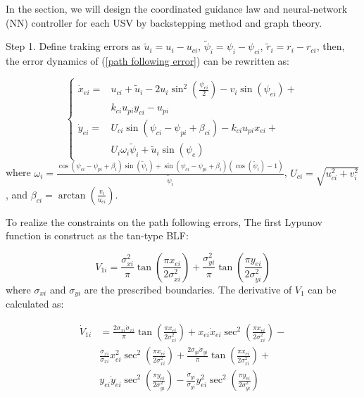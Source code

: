 \documentclass[english]{cccconf}
\begin{document}
In the section, we will design the coordinated guidance law and neural-network (NN) controller for each USV by backstepping method and graph theory.

Step 1. Define traking errors as $\tilde{u}_i=u_i-u_{ci}$, $\tilde{\psi}_i=\psi_i-\psi_{ci}$, $\tilde{r}_i=r_i-r_{ci}$, then, the error dynamics of (\ref{path following error}) can be rewritten as:

\begin{equation}\label{path following error dynamics 1}
	\left\{
	\begin{aligned}
		\dot{x}_{ei}=&u_{ci}+\tilde{u}_i-2u_i\sin^2(\frac{\psi_{ei}}{2})-v_i\sin(\psi_{ei})+\\&k_{ci}u_{pi}y_{ei}-u_{pi}\\
		\dot{y}_{ei}=&U_{ci}\sin(\psi_{ci}-\psi_{pi}+\beta_{ci})-k_{ci}u_{pi}x_{ei}+\\&U_i\omega_i\tilde{\psi}_i+\tilde{u}_i\sin(\psi_{e})
	\end{aligned}
	\right.
\end{equation}
where $\omega_i=\frac{\cos(\psi_{ci}-\psi_{pi}+\beta_i)\sin(\tilde{\psi}_i)+\sin(\psi_{ci}-\psi_{pi}+\beta_i)(\cos(\tilde{\psi}_i)-1)}{\tilde{\psi}_i}$, $U_{ci}=\sqrt{u^2_{ci}+v^2_{i}}$, and $\beta_{ci}=\arctan({\frac{v_i}{u_{ci}}})$.

To realize the constraints on the path following errors, The first Lypunov function is construct as the tan-type BLF:

\begin{equation}\label{V1}
	V_{1i}=\frac{\sigma^2_{xi}}{\pi}\tan(\frac{\pi x_{ei}}{2\sigma^2_{xi}})+\frac{\sigma^2_{yi}}{\pi}\tan(\frac{\pi y_{ei}}{2\sigma^2_{yi}})
\end{equation}
where $\sigma_{xi}$ and $\sigma_{yi}$ are the prescribed boundaries. The derivative of $V_1$ can be calculated as:

\begin{equation}\label{V1dot0}
	\begin{aligned}
		\dot{V}_{1i}&=\frac{2\sigma_{xi}\dot{\sigma}_{xi}}{\pi}\tan(\frac{\pi x_{ei}}{2\sigma^2_{xi}})+x_{ei}\dot{x}_{ei}\sec^2(\frac{\pi x_{ei}}{2\sigma^2_{xi}})-\\
		&\frac{\dot{\sigma}_{xi}}{\sigma_{xi}}x^2_{ei}\sec^2(\frac{\pi x_{ei}}{2\sigma^2_{xi}})+\frac{2\sigma_{yi}\dot{\sigma}_{yi}}{\pi}\tan(\frac{\pi x_{ei}}{2\sigma^2_{xi}})+\\
		&y_{ei}\dot{y}_{ei}\sec^2(\frac{\pi y_{ei}}{2\sigma^2_{yi}})-\frac{\dot{\sigma}_{yi}}{\sigma_{yi}}y^2_{ei}\sec^2(\frac{\pi y_{ei}}{2\sigma^2_{yi}})
	\end{aligned}
\end{equation}
\end{document}
